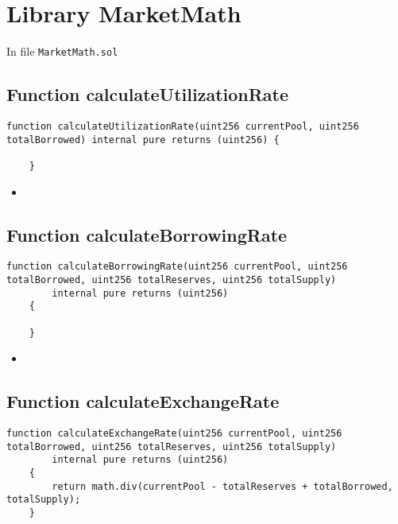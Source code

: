 
\section{Library MarketMath}

In file {\tt MarketMath.sol}


\subsection{Function calculateUtilizationRate}

\begin{lstlisting}[firstnumber=4]
    function calculateUtilizationRate(uint256 currentPool, uint256 totalBorrowed) internal pure returns (uint256) {

    }
\end{lstlisting}

\noindent\begin{itemize}
  \item {}
\end{itemize}


\subsection{Function calculateBorrowingRate}

\begin{lstlisting}[firstnumber=8]
    function calculateBorrowingRate(uint256 currentPool, uint256 totalBorrowed, uint256 totalReserves, uint256 totalSupply) 
        internal pure returns (uint256) 
    {

    }
\end{lstlisting}

\noindent\begin{itemize}
  \item {}
\end{itemize}


\subsection{Function calculateExchangeRate}

\begin{lstlisting}[firstnumber=14]
    function calculateExchangeRate(uint256 currentPool, uint256 totalBorrowed, uint256 totalReserves, uint256 totalSupply)
        internal pure returns (uint256) 
    {
        return math.div(currentPool - totalReserves + totalBorrowed, totalSupply);
    }
\end{lstlisting}


